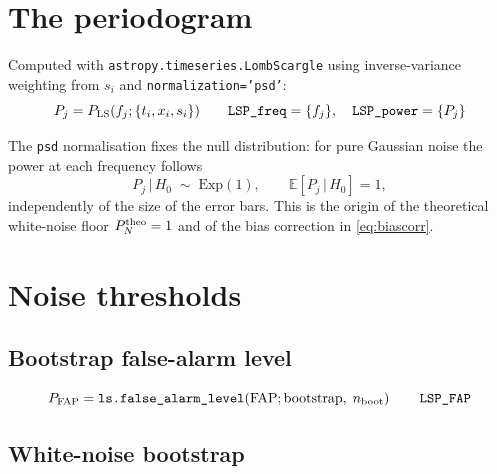 \documentclass[11pt]{article}
\begin{document}
\section{The periodogram}

Computed with \texttt{astropy.timeseries.LombScargle} using inverse-variance weighting
from $s_i$ and \texttt{normalization='psd'}:
%
\begin{equation}
  P_j = P_{\rm LS}(f_j; \{t_i, x_i, s_i\})
  \qquad
  \texttt{LSP\_freq} = \{f_j\}, \quad \texttt{LSP\_power} = \{P_j\}
  \label{eq:lsp}
\end{equation}

The \texttt{psd} normalisation fixes the null distribution: for pure Gaussian noise the
power at each frequency follows
%
\begin{equation}
  P_j \,\big|\, H_0 \;\sim\; \mathrm{Exp}(1),
  \qquad \mathbb{E}[P_j \,|\, H_0] = 1 ,
  \label{eq:null}
\end{equation}
%
independently of the size of the error bars. This is the origin of the theoretical
white-noise floor $P_N^{\rm theo} = 1$ and of the bias correction in
\eqref{eq:biascorr}.

\section{Noise thresholds}

\subsection{Bootstrap false-alarm level}

\begin{equation}
  P_{\rm FAP} = \texttt{ls.false\_alarm\_level}\!\left(
    \mathrm{FAP}; \text{bootstrap}, \; n_{\rm boot}\right)
  \qquad \texttt{LSP\_FAP}
  \label{eq:fap}
\end{equation}

\subsection{White-noise bootstrap}
\end{document}
